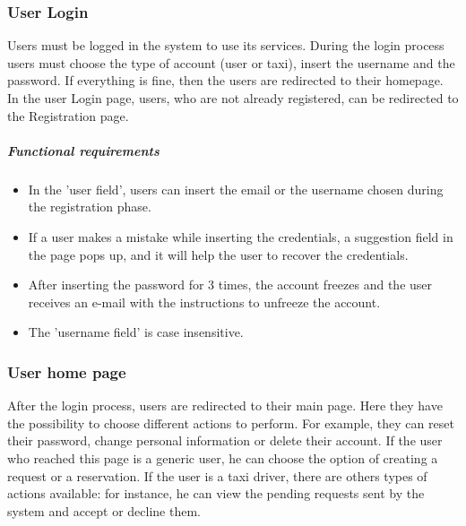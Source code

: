 \subsubsection{User Login}
Users must be logged in the system to use its services.
During the login process users must choose the type of account (user or taxi), insert the username and the password. If everything is fine, then the users are redirected to their homepage.
In the user Login page, users, who are not already registered, can be redirected to the Registration page.

	\subparagraph{Functional requirements}
	\noindent
		\begin{itemize}
			\item In the 'user field', users can insert the email or the username chosen during the registration phase.
			\item If a user makes a mistake while inserting the credentials, a suggestion field in the page pops up, and it will help the user to recover the credentials.
			\item After inserting the password for 3 times, the account freezes and the user receives an e-mail with the instructions to unfreeze the account.
			\item The 'username field' is case insensitive.
			
		\end{itemize}

\subsubsection{User home page}  
After the login process, users are redirected to their main page. Here they have the possibility to choose different actions to perform.
For example, they can reset their password, change personal information or delete their account.
If the user who reached this page is a generic user, he can choose the option of creating a request or a reservation.
If the user is a taxi driver, there are others types of actions available: for instance, he can view the pending requests sent by the system and accept or decline them.

